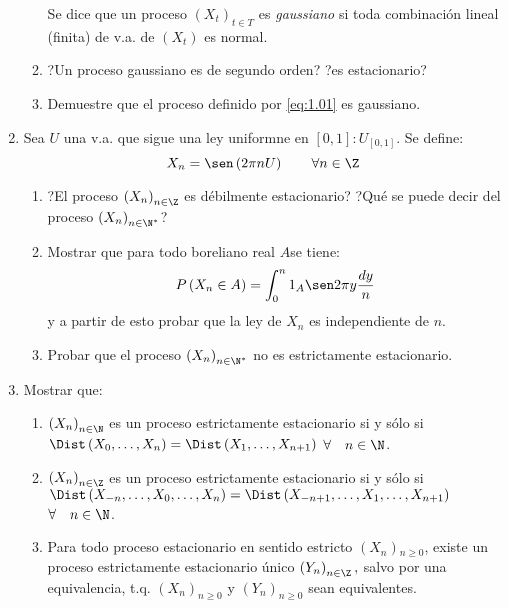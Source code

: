 \begin{enumerate}
\begin{enumerate}
\begin{definicion}
 Se dice que un proceso $(X_{t} )_{t\in T} $ es \emph{gaussiano} si toda combinaci\'{o}n lineal (finita) de v.a. de $(X_{t})$ es normal.
\end{definicion}

\item ?Un proceso gaussiano es de segundo orden? ?es estacionario?
\item Demuestre que el proceso definido por \eqref{eq:1.01} es gaussiano.
\end{enumerate}

\item Sea $U$ una v.a. que sigue una ley uniformne en $[0,1]:U_{\left[ {0,1} \right]} $. Se define:
\[
X_{n} =\sen\left( {2\pi nU} \right)\qquad
\forall n\in \Z
\]
\begin{enumerate}
\item ?El proceso $\left( {X_{n} } \right)_{n\in \Z} $ es d\'{e}bilmente estacionario? ?Qu\'{e} se puede decir del proceso $\left( {X_{n} } \right)_{n\in \N^{\ast }} $? 

\item Mostrar que para todo boreliano real $A$se tiene:
\[
P\left( {X_{n} \in { A}} \right)= \int_{0}^{n} 1_{A} \sen 2\pi y
\frac{dy}{n}
\]
y a partir de esto probar que la ley de $X_{n} $ es independiente de $n$.

\item Probar que el proceso $\left( {X_{n} } \right)_{n\in \N^{\ast }} $ no es estrictamente estacionario.
\end{enumerate}

\item Mostrar que:
\begin{enumerate}
\item $\left( {X_{n} } \right)_{n\in {\N}} $ es un proceso estrictamente estacionario si y s\'{o}lo si $\Dist\left( {X_{0} ,\ldots,X_{n} } \right)=\Dist\left( {X_{1} ,\ldots,X_{n+1} } \right)$ $\forall \quad n\in {\N}$.
\item $\left( {X_{n} } \right)_{n\in {\Z}} $ es un proceso estrictamente estacionario si y s\'{o}lo si $\Dist\left( {X_{-n} ,\ldots,X_{0} ,\ldots,X_{n} } \right)=\Dist\left( {X_{-n+1} ,\ldots,X_{1} ,\ldots,X_{n+1} } \right)$ $\forall \quad n\in {\N}$.
\item Para todo proceso estacionario en sentido estricto $\left( {X_{n} } \right){ }_{n\geq 0}$, existe un proceso estrictamente estacionario \'{u}nico $\left( {Y_{n} } \right)_{n\in {\Z}} ,$ salvo por una equivalencia, t.q. $\left( {X_{n} } \right)_{n\geq 0} $ y $\left( {Y_{n} } \right)_{n\geq 0} $ sean equivalentes.
\end{enumerate}


\end{enumerate}
